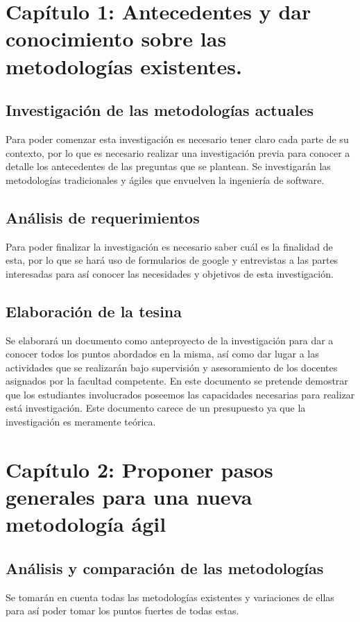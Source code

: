 \section{\textbf{Capítulo 1:} Antecedentes y dar conocimiento sobre las metodologías existentes.}

	\subsection{Investigación de las metodologías actuales} 
		Para poder comenzar esta investigación es necesario tener claro cada parte de su contexto, por lo que es necesario realizar una investigación previa para conocer a detalle los antecedentes de las preguntas que se plantean.
		Se investigarán las metodologías tradicionales y ágiles que envuelven la ingeniería de
		software.
		
	\subsection{Análisis de requerimientos}
		Para poder finalizar la investigación es necesario saber cuál es la finalidad de esta, por lo que se hará uso de formularios de google y entrevistas a las partes interesadas para así conocer las necesidades y objetivos de esta investigación.
		
	\subsection{Elaboración de la tesina}
		Se elaborará un documento como anteproyecto de la investigación para dar a conocer todos los puntos abordados en la misma, así como dar lugar a las actividades que se realizarán bajo supervisión y asesoramiento de los docentes asignados por la facultad competente.
		En este documento se pretende demostrar que los estudiantes involucrados
		poseemos las capacidades necesarias para realizar está investigación.
		Este documento carece de un presupuesto ya que la investigación es meramente teórica.
		
\section{\textbf{Capítulo 2:} Proponer pasos generales para una nueva metodología ágil}

	\subsection{Análisis y comparación de las metodologías}
		Se tomarán en cuenta todas las metodologías existentes y variaciones de ellas para así poder tomar los puntos fuertes de todas estas.
	
